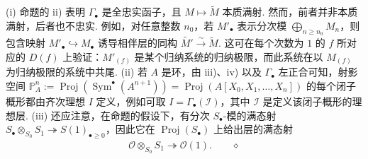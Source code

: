 \begin{remark}\label{item:ag-2-1-3}
\textup{(i)} 命题的 ii) 表明 $\Gamma_\bullet$ 是全忠实函子，且 $M\mapsto\widetilde M$ 本质满射. 然而，前者并非本质满射，后者也不忠实. 例如，对任意整数 $n_0$，若 $M'_\bullet$ 表示分次模 $\bigoplus_{n\geqslant n_0}M_n$，则包含映射 $M'_\bullet\hookrightarrow M_\bullet$ 诱导相伴层的同构 $\widetilde{M'}\xrightarrow\sim\widetilde M$. 这可在每个次数为 $1$ 的 $f$ 所对应的 $D(f)$ 上验证：$M'_{(f)}$ 是某个归纳系统的归纳极限，而此系统在以 $M_{(f)}$ 为归纳极限的系统中共尾.
\textup{(ii)} 若 $A$ 是环，由 iii)、iv) 以及 $\Gamma_\bullet$ 左正合可知，射影空间 $\mathbb P_A^n:=\operatorname{Proj}(\operatorname{Sym}^\bullet(A^{n+1}))=\operatorname{Proj}(A[X_0,X_1,\ldots,X_n])$ 的每个闭子概形都由齐次理想 $I$ 定义，例如可取 $I=\Gamma_\bullet(\mathcal I)$，其中 $\mathcal I$ 是定义该闭子概形的理想层.
\textup{(iii)} 还应注意，在命题的假设下，有分次 $S_\bullet$-模的满态射 $S_\bullet\otimes_{S_0}S_1\twoheadrightarrow S(1)_{\bullet\geqslant0}$，因此它在 $\operatorname{Proj}(S_\bullet)$ 上给出层的满态射
\begin{align}
\mathcal O\otimes_{S_0}S_1\twoheadrightarrow\mathcal O(1).\qquad\diamond\tag{2.1.3.1}\label{eq:ag-2-1-3-1}
\end{align}
\renewcommand{\envenddiamond}{}%
\end{remark}
